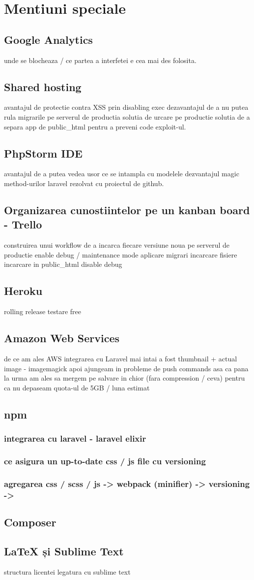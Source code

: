 \section{Mentiuni speciale}
	\subsection{Google Analytics}
	unde se blocheaza / ce partea a interfetei e cea mai des folosita.
	\subsection{Shared hosting}
		avantajul de protectie contra XSS prin disabling exec
		dezavantajul de a nu putea rula migrarile pe serverul de productia
		solutia de urcare pe productie
		solutia de a separa app de public\_html pentru a preveni code exploit-ul.
	\subsection{PhpStorm IDE}
	\label{sec:phpstorm}
		avantajul de a putea vedea usor ce se intampla cu modelele
		dezvantajul magic method-urilor laravel rezolvat cu proiectul de github.
	\subsection{Organizarea cunostiintelor pe un kanban board - Trello}
		construirea unui workflow de a incarca fiecare versiune noua pe serverul de productie
			enable debug / maintenance mode
			aplicare migrari
			incarcare fisiere
			incarcare in public\_html
			disable debug
	\subsection{Heroku}
		rolling release
		testare
		free
	\subsection{Amazon Web Services}
		de ce am ales AWS
		integrarea cu Laravel
		mai intai a fost thumbnail + actual image - imagemagick
		apoi ajungeam in probleme de push commands
		asa ca pana la urma am ales sa mergem pe salvare in chior (fara compression / ceva)
			pentru ca nu depaseam quota-ul de 5GB / luna estimat
	\subsection{npm}
		\subsubsection{integrarea cu laravel - laravel elixir}
		\subsubsection{ce asigura un up-to-date css / js file cu versioning}
		\subsubsection{agregarea css / scss / js -> webpack (minifier) -> versioning ->}
	\subsection{Composer}
	\subsection{LaTeX și Sublime Text}
		structura licentei
		legatura cu sublime text
